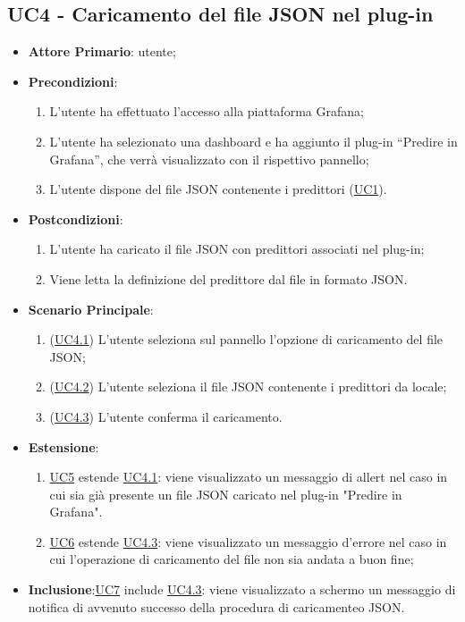 	\subsection{UC4 - Caricamento del file JSON nel plug-in}
		\begin{itemize}
			\item\textbf{Attore Primario}: utente;
			\item\textbf{Precondizioni}: 
				\begin{enumerate}
					\item L’utente ha effettuato l’accesso alla piattaforma Grafana;
					\item L’utente ha selezionato una dashboard e ha aggiunto il plug-in “Predire in Grafana”,  che verrà visualizzato con il rispettivo pannello;
					\item L’utente dispone del file JSON contenente i predittori (\hyperref[par:UC1]{UC1}). 
				\end{enumerate}
			\item\textbf{Postcondizioni}:
				\begin{enumerate}
					\item L’utente ha caricato il file JSON con predittori associati nel plug-in;
					\item Viene letta la definizione del predittore dal file in formato JSON. 
				\end{enumerate}
			\item\textbf{Scenario Principale}:
				\begin{enumerate}
					\item (\hyperref[par:UC4.1]{UC4.1}) L’utente seleziona sul pannello l’opzione di caricamento del file JSON; 
					\item (\hyperref[par:UC4.2]{UC4.2}) L’utente seleziona il file JSON contenente i predittori da locale;
					\item (\hyperref[par:UC4.3]{UC4.3}) L'utente conferma il caricamento.
				\end{enumerate}
			\item\textbf{Estensione}:
				\begin{enumerate} 
					\item\hyperref[par:UC5]{UC5} estende \hyperref[par:UC4.1]{UC4.1}: viene visualizzato un messaggio di allert nel caso in cui sia già presente un file JSON caricato nel plug-in "Predire in Grafana".
					\item\hyperref[par:UC6]{UC6} estende \hyperref[par:UC4.3]{UC4.3}: viene visualizzato un messaggio d’errore nel caso in cui l’operazione di caricamento del file non sia andata a buon fine;
				\end{enumerate}	
			\item\textbf{Inclusione}:\hyperref[par:UC7]{UC7} include \hyperref[par:UC4.3]{UC4.3}: viene visualizzato a schermo un messaggio di notifica di avvenuto successo della procedura di caricamenteo JSON.
		\end{itemize}
		
